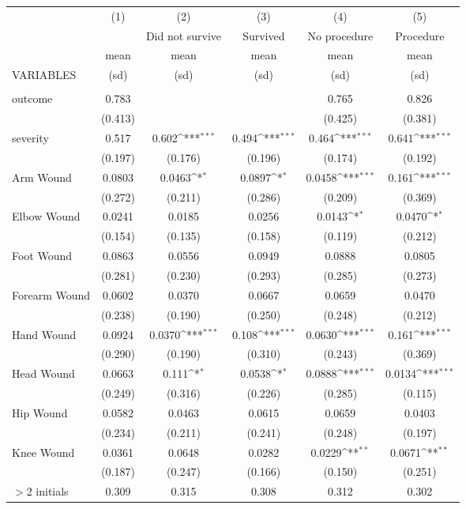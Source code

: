 {
\def\sym#1{\ifmmode^{#1}\else\(^{#1}\)\fi}
\begin{tabular}{lccccc} \hline
 & (1) & (2) & (3) & (4) & (5) \\
 &  & Did not survive & Survived & No procedure & Procedure \\
 & mean & mean & mean & mean & mean \\
VARIABLES & (sd) & (sd) & (sd) & (sd) & (sd) \\ \hline
 &  &  &  &  &  \\
outcome & 0.783 &  &  & 0.765 & 0.826 \\
 & (0.413) &  &  & (0.425) & (0.381) \\
severity & 0.517 & 0.602\sym{***} & 0.494\sym{***} & 0.464\sym{***} & 0.641\sym{***} \\
 & (0.197) & (0.176) & (0.196) & (0.174) & (0.192) \\
Arm Wound & 0.0803 & 0.0463\sym{*} & 0.0897\sym{*}  & 0.0458\sym{***}  & 0.161\sym{***}  \\
 & (0.272) & (0.211) & (0.286) & (0.209) & (0.369) \\
Elbow Wound & 0.0241 & 0.0185 & 0.0256 & 0.0143\sym{*} & 0.0470\sym{*} \\
 & (0.154) & (0.135) & (0.158) & (0.119) & (0.212) \\
Foot Wound & 0.0863 & 0.0556 & 0.0949 & 0.0888 & 0.0805 \\
 & (0.281) & (0.230) & (0.293) & (0.285) & (0.273) \\
Forearm Wound & 0.0602 & 0.0370 & 0.0667 & 0.0659 & 0.0470 \\
 & (0.238) & (0.190) & (0.250) & (0.248) & (0.212) \\
Hand Wound & 0.0924 & 0.0370\sym{***} & 0.108\sym{***} & 0.0630\sym{***} & 0.161\sym{***} \\
 & (0.290) & (0.190) & (0.310) & (0.243) & (0.369) \\
Head Wound & 0.0663 & 0.111\sym{*} & 0.0538\sym{*} & 0.0888\sym{***} & 0.0134\sym{***} \\
 & (0.249) & (0.316) & (0.226) & (0.285) & (0.115) \\
Hip Wound & 0.0582 & 0.0463 & 0.0615 & 0.0659 & 0.0403 \\
 & (0.234) & (0.211) & (0.241) & (0.248) & (0.197) \\
Knee Wound & 0.0361 & 0.0648 & 0.0282 & 0.0229\sym{**} & 0.0671\sym{**} \\
 & (0.187) & (0.247) & (0.166) & (0.150) & (0.251) \\
$>$2 initials & 0.309 & 0.315 & 0.308 & 0.312 & 0.302 \\

\end{tabular}}
